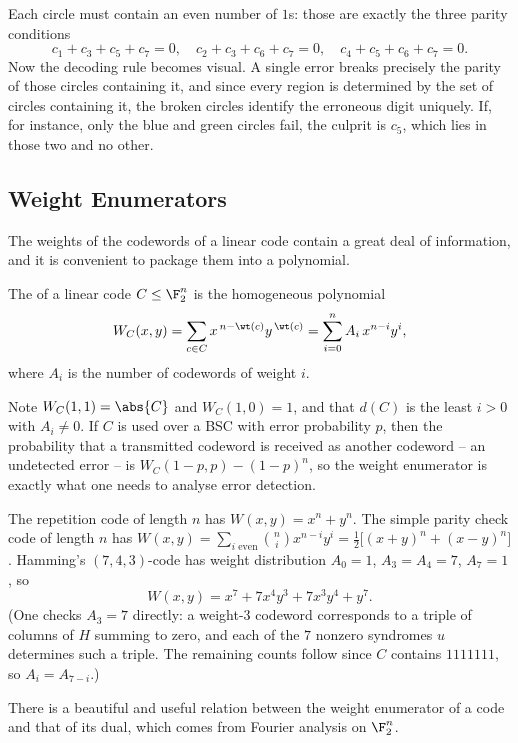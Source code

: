 Each circle must contain an even number of $1$s: those are exactly the three parity conditions
$$c_1+c_3+c_5+c_7 = 0,\quad c_2+c_3+c_6+c_7=0,\quad c_4+c_5+c_6+c_7=0.$$
Now the decoding rule becomes visual. A single error breaks precisely the parity of those circles containing it, and since every region is determined by the set of circles containing it, the broken circles identify the erroneous digit uniquely. If, for instance, only the blue and green circles fail, the culprit is $c_5$, which lies in those two and no other.

\subsection{Weight Enumerators}

The weights of the codewords of a linear code contain a great deal of information, and it is convenient to package them into a polynomial.

\begin{definition}
	The  of a linear code $C \le \F_2^n$ is the homogeneous polynomial
	$$W_C(x,y) = \sum_{c \in C} x^{\,n-\wt(c)}y^{\,\wt(c)} = \sum_{i=0}^n A_i\, x^{n-i}y^i,$$
	where $A_i$ is the number of codewords of weight $i$.
\end{definition}

Note $W_C(1,1) = \abs{C}$ and $W_C(1,0) = 1$, and that $d(C)$ is the least $i>0$ with $A_i \ne 0$. If $C$ is used over a BSC with error probability $p$, then the probability that a transmitted codeword is received as another codeword -- an undetected error -- is $W_C(1-p,p) - (1-p)^n$, so the weight enumerator is exactly what one needs to analyse error detection.

\begin{example}
	The repetition code of length $n$ has $W(x,y) = x^n + y^n$. The simple parity check code of length $n$ has $W(x,y) = \sum_{i \text{ even}}\binom ni x^{n-i}y^i = \tfrac12\bigl[(x+y)^n + (x-y)^n\bigr]$. Hamming's $(7,4,3)$-code has weight distribution $A_0 = 1$, $A_3 = A_4 = 7$, $A_7 = 1$, so
	$$W(x,y) = x^7 + 7x^4y^3+7x^3y^4+y^7.$$
	(One checks $A_3 = 7$ directly: a weight-$3$ codeword corresponds to a triple of columns of $H$ summing to zero, and each of the $7$ nonzero syndromes $u$ determines such a triple. The remaining counts follow since $C$ contains $1111111$, so $A_i = A_{7-i}$.)
\end{example}

There is a beautiful and useful relation between the weight enumerator of a code and that of its dual, which comes from Fourier analysis on $\F_2^n$.

